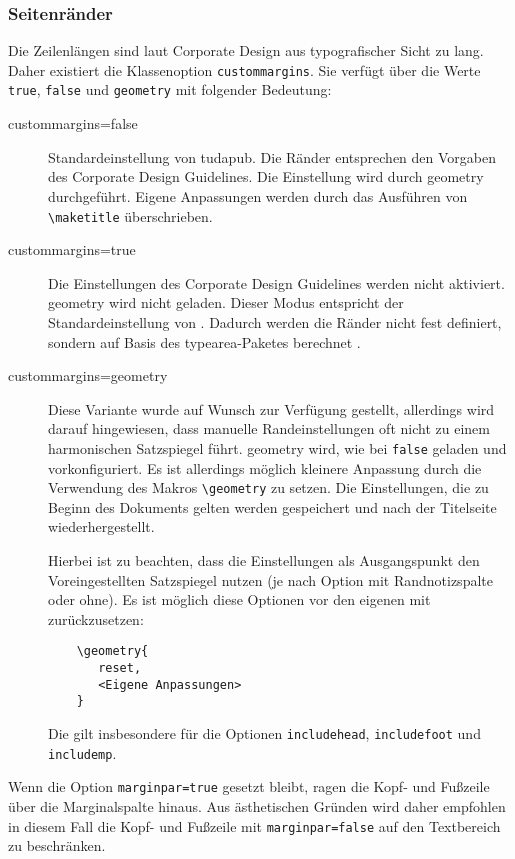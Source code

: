 \documentclass[
	ngerman,
	accentcolor=9c,%
	]{tudapub}
\let\code\texttt
\let\pck\textsf
\let\cls\textsf
\begin{document}
\subsubsection{Seitenränder}
Die Zeilenlängen sind laut Corporate Design aus typografischer Sicht zu lang.
Daher existiert die Klassenoption \code{custommargins}. Sie verfügt über die Werte \code{true}, \code{false} und \code{geometry} mit folgender Bedeutung:

\begin{description}
\item[custommargins=false] Standardeinstellung von \cls{tudapub}. Die Ränder entsprechen den Vorgaben des Corporate Design Guidelines. Die Einstellung wird durch \pck{geometry} durchgeführt. Eigene Anpassungen werden durch das Ausführen von \code{\textbackslash{}maketitle} überschrieben.
\item[custommargins=true] Die Einstellungen des Corporate Design Guidelines werden nicht aktiviert. \pck{geometry} wird nicht geladen. Dieser Modus entspricht der Standardeinstellung von \KOMAScript{}. Dadurch werden die Ränder nicht fest definiert, sondern auf Basis des \pck{typearea}-Paketes berechnet \cite[vgl.][]{scrguide}.
\item[custommargins=geometry]  Diese Variante wurde auf Wunsch zur Verfügung gestellt, allerdings wird darauf hingewiesen, dass manuelle Randeinstellungen oft nicht zu einem harmonischen Satzspiegel führt.
\pck{geometry} wird, wie bei \code{false} geladen und vorkonfiguriert. Es ist allerdings möglich kleinere Anpassung durch die Verwendung des Makros \code{\textbackslash{}geometry} zu setzen. Die Einstellungen, die zu Beginn des Dokuments gelten werden gespeichert und nach der Titelseite wiederhergestellt.

Hierbei ist zu beachten, dass die Einstellungen als Ausgangspunkt den Voreingestellten Satzspiegel nutzen (je nach Option mit Randnotizspalte oder ohne). Es ist möglich diese Optionen vor den eigenen mit zurückzusetzen:
\begin{verbatim}
	\geometry{
	   reset,
	   <Eigene Anpassungen>
	}
\end{verbatim}
Die gilt insbesondere für die Optionen \code{includehead}, \code{includefoot} und \code{includemp}.
\end{description}

Wenn die Option \code{marginpar=true} gesetzt bleibt, ragen die Kopf- und Fußzeile über die Marginalspalte hinaus. Aus ästhetischen Gründen wird daher empfohlen in diesem Fall die Kopf- und Fußzeile  mit \code{marginpar=false}  auf den Textbereich zu beschränken.
\end{document}

